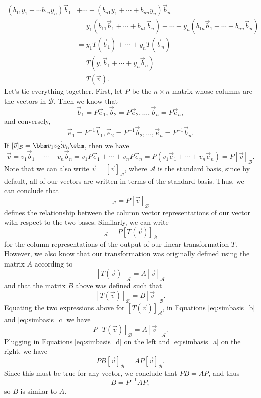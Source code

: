 \begin{align*}
 (b_{11}y_1+\cdots b_{1n}y_n)\vec{b}_1 & +  \cdots + (b_{n1}y_1+\cdots + b_{nn}y_n)\vec{b}_n\\
& = y_1(b_{11}\vec{b}_1+\cdots + b_{n1}\vec{b}_n) +   \cdots + y_n(b_{1n}\vec{b}_1+\cdots + b_{nn}\vec{b}_n)\\
& = y_1T(\vec{b}_1) +  \cdots + y_nT(\vec{b}_n)\\
& = T(y_1\vec{b}_1 +  \cdots + y_n\vec{b}_n)\\
& = T(\vec{v}).
\end{align*}
Let's tie everything together. First, let $P$ be the $n\times n$ matrix whose columns are the vectors in $\mathcal{B}$. Then we know that
\[
 \vec{b}_1 = P\vec{e}_1, \vec{b}_2=P\vec{e}_2, \ldots, \vec{b}_n = P\vec{e}_n,
\]
and conversely,
\[
 \vec{e}_1 = P^{-1}\vec{b}_1, \vec{e}_2 = P^{-1}\vec{b}_2, \ldots, \vec{e}_n = P^{-1}\vec{b}_n.
\]
If $[\vec{v}]_{\mathcal{B}} = \bbm v_1\\v_2\\\vdots \\v_n\ebm$, then we have
\[
 \vec{v} = v_1\vec{b}_1 +\cdots + v_n\vec{b}_n = v_1P\vec{e}_1 +\cdots +v_nP\vec{e}_n = P(v_1\vec{e}_1+\cdots + v_n\vec{e}_n) = P[\vec{v}]_{\mathcal{B}}.
\]
Note that we can also write $\vec{v} = [\vec{v}]_{\mathcal{A}}$, where $\mathcal{A}$ is the standard basis, since by default, all of our vectors are written in terms of the standard basis. Thus, we can conclude that
\begin{equation}
 [\vec{v}]_{\mathcal{A}} = P[\vec{v}]_{\mathcal{B}}\label{eq:simbasis_a}
\end{equation}
defines the relationship between the column vector representations of our vector with respect to the two bases. Similarly, we can write
\begin{equation}
 [T(\vec{v})]_{\mathcal{A}} = P[T(\vec{v})]_{\mathcal{B}}\label{eq:simbasis_b}
\end{equation}
for the column representations of the output of our linear transformation $T$. However, we also know that our transformation was originally defined using the matrix $A$ according to
\begin{equation}\label{eq:simbasis_c}
 [T(\vec{v})]_{\mathcal{A}} = A[\vec{v}]_{\mathcal{A}}
\end{equation}
and that the matrix $B$ above was defined such that
\begin{equation}\label{eq:simbasis_d}
 [T(\vec{v})]_{\mathcal{B}} = B[\vec{v}]_{\mathcal{B}}.
\end{equation}
Equating the two expressions above for $[T(\vec{v})]_{\mathcal{A}}$, in Equations \eqref{eq:simbasis_b} and \eqref{eq:simbasis_c} we have
\[
 P[T(\vec{v})]_{\mathcal{B}} = A[\vec{v}]_{\mathcal{A}}.
\]
Plugging in Equations \eqref{eq:simbasis_d} on the left and \eqref{eq:simbasis_a} on the right, we have
\[
 PB[\vec{v}]_{\mathcal{B}} = AP[\vec{v}]_{\mathcal{B}}.
\]
Since this must be true for any vector, we conclude that $PB = AP$, and thus
\[
 B = P^{-1}AP,
\]
so $B$ is similar to $A$.

